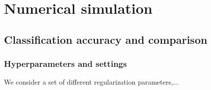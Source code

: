 \documentclass[
reprint,
aps,
pra,
]{revtex4-2}
\theoremstyle{plain}
\theoremstyle{definition}
\begin{document}



\section{Numerical simulation}\label{sec:numerical_simulation}


\subsection{Classification accuracy and comparison}
\subsubsection{Hyperparameters and settings}
We consider a set of different regularization parameters,...
\end{document}
